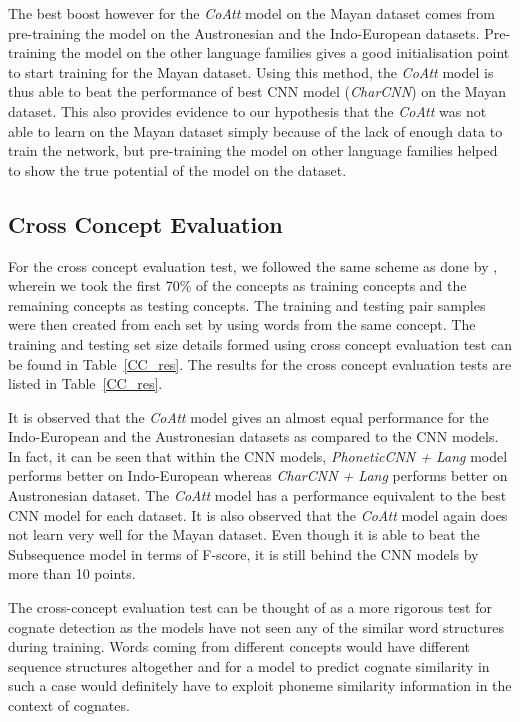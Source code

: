 \documentclass[11pt,letterpaper]{article}
\begin{document}
The best boost however for the \textit{CoAtt} model on the Mayan dataset comes from pre-training the model on the Austronesian and the Indo-European datasets. Pre-training the model on the other language families gives a good initialisation point to start training for the Mayan dataset. Using this method, the \textit{CoAtt} model is thus able to beat the performance of best CNN model (\textit{CharCNN}) on the Mayan dataset. This also provides evidence to our hypothesis that the \textit{CoAtt} was not able to learn on the Mayan dataset simply because of the lack of enough data to train the network, but pre-training the model on other language families helped to show the true potential of the model on the dataset.

\subsection{Cross Concept Evaluation}

For the cross concept evaluation test, we followed the same scheme as done by \citet{rama2016siamese}, wherein we took the first 70\% of the concepts as training concepts and the remaining concepts as testing concepts. The training and testing pair samples were then created from each set by using words from the same concept. The training and testing set size details formed using cross concept evaluation test can be found in Table~\ref{CC_res}. The results for the cross concept evaluation tests are listed in Table~\ref{CC_res}.

It is observed that the \textit{CoAtt} model gives an almost equal performance for the Indo-European and the Austronesian datasets as compared to the CNN models. In fact, it can be seen that within the CNN models, \textit{PhoneticCNN + Lang} model performs better on Indo-European whereas \textit{CharCNN + Lang} performs better on Austronesian dataset. The \textit{CoAtt} model has a performance equivalent to the best CNN model for each dataset. It is also observed that the \textit{CoAtt} model again does not learn very well for the Mayan dataset. Even though it is able to beat the Subsequence model in terms of F-score, it is still behind the CNN models by more than 10 points.

The cross-concept evaluation test can be thought of as a more rigorous test for cognate detection as the models have not seen any of the similar word structures during training. Words coming from different concepts would have different sequence structures altogether and for a model to predict cognate similarity in such a case would definitely have to exploit phoneme similarity information in the context of cognates.
\end{document}

